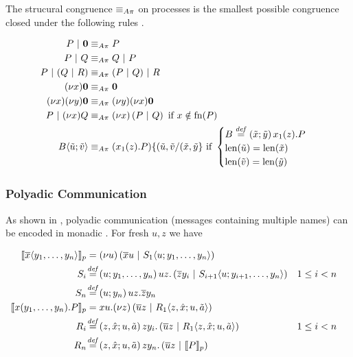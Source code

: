 The strucural congruence $\equiv_{A\pi}$ on processes
is the smallest possible congruence closed under the following rules
\cite{thati_theory_2003}.

\begin{align*}
  P \apar \anullproc
    &\astructequ P \\
  P \apar Q
    &\astructequ Q \apar P \\
  P \apar (Q \apar R)
    &\astructequ (P \apar Q) \apar R \\
  \anew{x}{\anullproc}
    &\astructequ \anullproc \\
  \anew{x}{\anew{y}{\anullproc}}
    &\astructequ \anew{y}{\anew{x}{\anullproc}} \\
  P \apar \anew{x}{Q}
    &\astructequ \anew*{x}{P \apar Q} \text{ if } x \notin \fn{P} \\
  \ains{B}{\tilde{u}}{\tilde{v}}
    &\astructequ (\arcv{x_1}{z} . P)\substitution{\subst{(\tilde{u},\tilde{v}}{(\tilde{x},\tilde{y}}}
    \text{ if }
    \begin{cases}
      \adef{B}{\tilde{x}}{\tilde{y}}{\arcv{x_1}{z} . P}\\
      \operatorname{len}(\tilde{u}) = \operatorname{len}(\tilde{x})\\
      \operatorname{len}(\tilde{v}) = \operatorname{len}(\tilde{y})
    \end{cases}
\end{align*}


\subsubsection{Polyadic Communication}

As shown in \cite{agha_algebraic_2004},
polyadic communication (messages containing multiple names)
can be encoded in monadic \actorpicalc.
For fresh $u, z$ we have

\begin{align*}
  \encPolyAP{\asnd{x}{y_1, \ldots, y_n}}
  &= \anew*{u}{\amsnd{x}{u} \apar \ains{S_1}{u}{y_1, \ldots, y_n}}
  \\
  \adef*{S_i}{u}{y_1, \ldots, y_n}
    {\amrcv{u}{z} . \parens{\amsnd{z}{y_i} \apar \ains{S_{i+1}}{u}{y_{i+1}, \ldots, y_n}}}
    && 1 \leq i < n
  \\
  \adef*{S_n}{u}{y_n}{\amrcv{u}{z} . \amsnd{z}{y_n}}
  \\
  \encPolyAP{\arcv{x}{y_1, \ldots, y_n} . P}
  &= \amrcv{x}{u} . \anew*{z}{\amsnd{u}{z} \apar \ains{R_1}{z,\hat{x}}{u,\tilde{a}}}
  \\
  \adef*{R_i}{z,\hat{x}}{u,\tilde{a}}
    {\amrcv{z}{y_i} . \parens{\amsnd{u}{z} \apar \ains{R_1}{z,\hat{x}}{u,\tilde{a}}}}
    && 1 \leq i < n
  \\
  \adef*{R_n}{z,\hat{x}}{u,\tilde{a}}
    {\amrcv{z}{y_n} . \parens{\amsnd{u}{z} \apar \encPolyAP{P}}}
\end{align*}

